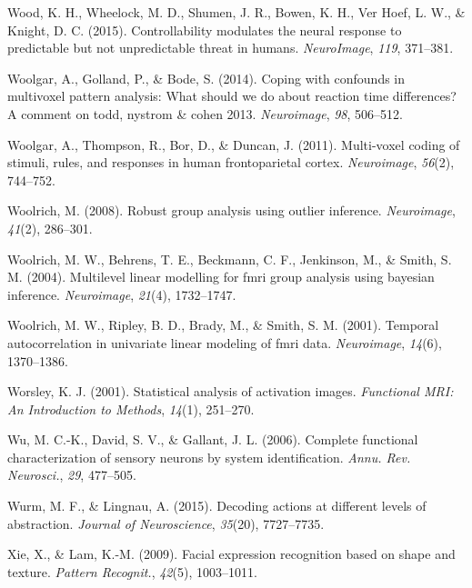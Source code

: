 \documentclass[11pt,american,a4paper,oneside,]{memoir} %
\begin{document}
\leavevmode\hypertarget{ref-wood2015controllability}{}%
Wood, K. H., Wheelock, M. D., Shumen, J. R., Bowen, K. H., Ver Hoef, L. W., \& Knight, D. C. (2015). Controllability modulates the neural response to predictable but not unpredictable threat in humans. \emph{NeuroImage}, \emph{119}, 371--381.

\leavevmode\hypertarget{ref-Woolgar2014-jb}{}%
Woolgar, A., Golland, P., \& Bode, S. (2014). Coping with confounds in multivoxel pattern analysis: What should we do about reaction time differences? A comment on todd, nystrom \& cohen 2013. \emph{Neuroimage}, \emph{98}, 506--512.

\leavevmode\hypertarget{ref-woolgar2011multi}{}%
Woolgar, A., Thompson, R., Bor, D., \& Duncan, J. (2011). Multi-voxel coding of stimuli, rules, and responses in human frontoparietal cortex. \emph{Neuroimage}, \emph{56}(2), 744--752.

\leavevmode\hypertarget{ref-woolrich2008robust}{}%
Woolrich, M. (2008). Robust group analysis using outlier inference. \emph{Neuroimage}, \emph{41}(2), 286--301.

\leavevmode\hypertarget{ref-woolrich2004multilevel}{}%
Woolrich, M. W., Behrens, T. E., Beckmann, C. F., Jenkinson, M., \& Smith, S. M. (2004). Multilevel linear modelling for fmri group analysis using bayesian inference. \emph{Neuroimage}, \emph{21}(4), 1732--1747.

\leavevmode\hypertarget{ref-woolrich2001temporal}{}%
Woolrich, M. W., Ripley, B. D., Brady, M., \& Smith, S. M. (2001). Temporal autocorrelation in univariate linear modeling of fmri data. \emph{Neuroimage}, \emph{14}(6), 1370--1386.

\leavevmode\hypertarget{ref-worsley2001statistical}{}%
Worsley, K. J. (2001). Statistical analysis of activation images. \emph{Functional MRI: An Introduction to Methods}, \emph{14}(1), 251--270.

\leavevmode\hypertarget{ref-Wu2006-qs}{}%
Wu, M. C.-K., David, S. V., \& Gallant, J. L. (2006). Complete functional characterization of sensory neurons by system identification. \emph{Annu. Rev. Neurosci.}, \emph{29}, 477--505.

\leavevmode\hypertarget{ref-wurm2015decoding}{}%
Wurm, M. F., \& Lingnau, A. (2015). Decoding actions at different levels of abstraction. \emph{Journal of Neuroscience}, \emph{35}(20), 7727--7735.

\leavevmode\hypertarget{ref-Xie2009-fp}{}%
Xie, X., \& Lam, K.-M. (2009). Facial expression recognition based on shape and texture. \emph{Pattern Recognit.}, \emph{42}(5), 1003--1011.
\end{document}
